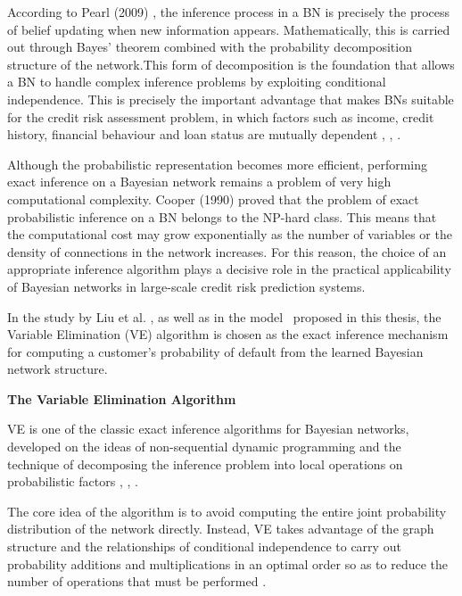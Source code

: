\vspace{1em}
According to Pearl (2009) \cite{pearl2009causality}, the inference process in a BN is precisely the process of belief updating when new information appears. Mathematically, this is carried out through Bayes' theorem combined with the probability decomposition structure of the network.This form of decomposition is the foundation that allows a BN to handle complex inference problems by exploiting conditional independence. This is precisely the important advantage that makes BNs suitable for the credit risk assessment problem, in which factors such as income, credit history, financial behaviour and loan status are mutually dependent \cite{pearl2009causality}, \cite{koller2009probabilistic}, \cite{darwiche2009modeling}. 

Although the probabilistic representation becomes more efficient, performing exact inference on a Bayesian network remains a problem of very high computational complexity. Cooper (1990) \cite{cooper1990computational} proved that the problem of exact probabilistic inference on a BN belongs to the NP-hard class. This means that the computational cost may grow exponentially as the number of variables or the density of connections in the network increases. For this reason, the choice of an appropriate inference algorithm plays a decisive role in the practical applicability of Bayesian networks in large-scale credit risk prediction systems. 

In the study by Liu et al. \cite{liu2024credit}, as well as in the model \ proposed in this thesis, the Variable Elimination (VE) algorithm is chosen as the exact inference mechanism for computing a customer's probability of default from the learned Bayesian network structure. 

\vspace{1em}
\noindent
\textbf{The Variable Elimination Algorithm}

\noindent
VE is one of the classic exact inference algorithms for Bayesian networks, developed on the ideas of non-sequential dynamic programming and the technique of decomposing the inference problem into local operations on probabilistic factors \cite{darwiche2009modeling}, \cite{jensen2007bayesian}, \cite{dechter1999bucket}.

The core idea of the algorithm is to avoid computing the entire joint probability distribution of the network directly. Instead, VE takes advantage of the graph structure and the relationships of conditional independence to carry out probability additions and multiplications in an optimal order so as to reduce the number of operations that must be performed \cite{darwiche2009modeling}.

